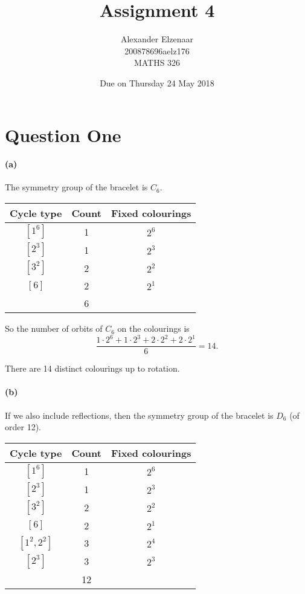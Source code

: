 \documentclass[a4paper,10pt]{amsart}
\author{Alexander Elzenaar\\200878696\quad \MakeLowercase{aelz176}\\MATHS 326}
\date{Due on Thursday 24 May 2018}
\title{Assignment 4}
\begin{document}
\maketitle

\section*{Question One}
\paragraph{(a)}
The symmetry group of the bracelet is $ C_6 $.
\begin{center}\begin{tabular}{|c|c|c|}\hline
  \textbf{Cycle type} & \textbf{Count} & \textbf{Fixed colourings}\\\hline
  $[1^6]$ & 1 & $ 2^6 $\\
  $[2^3]$ & 1 & $ 2^3 $\\
  $[3^2]$ & 2 & $ 2^2 $\\
  $[6]$ & 2 & $ 2^1 $\\\hline
   & 6 &\\\hline
\end{tabular}\end{center}

So the number of orbits of $ C_6 $ on the colourings is
\begin{displaymath}
  \frac{1 \cdot 2^6 + 1 \cdot 2^3 + 2 \cdot 2^2 + 2 \cdot 2^1}{6} = 14.
\end{displaymath}

There are 14 distinct colourings up to rotation.

\paragraph{(b)}
If we also include reflections, then the symmetry group of the bracelet is $ D_6 $ (of order 12).
\begin{center}\begin{tabular}{|c|c|c|}\hline
  \textbf{Cycle type} & \textbf{Count} & \textbf{Fixed colourings}\\\hline
  $[1^6]$ & 1 & $ 2^6 $\\
  $[2^3]$ & 1 & $ 2^3 $\\
  $[3^2]$ & 2 & $ 2^2 $\\
  $[6]$ & 2 & $ 2^1 $\\\hline
  $[1^2,2^2] $ & 3 & $ 2^4 $\\
  $[2^3] $ & 3 & $ 2^3 $\\\hline
   & 12 &\\\hline
\end{tabular}\end{center}
\end{document}
